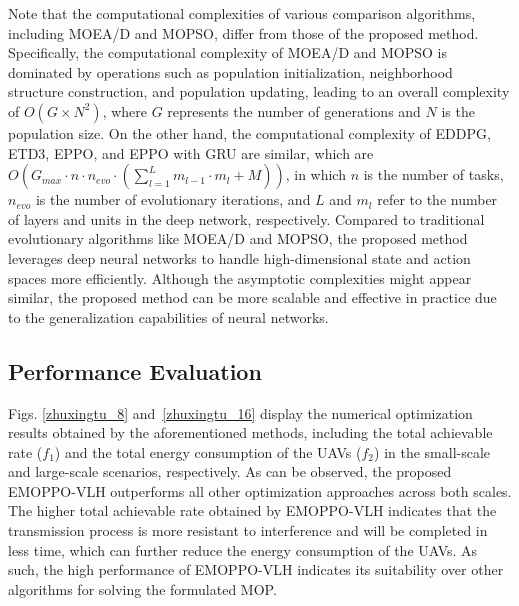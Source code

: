 \documentclass[10pt,journal,compsoc]{IEEEtran}
\begin{document}
\par Note that the computational complexities of various comparison algorithms, including MOEA/D and MOPSO, differ from those of the proposed method. Specifically, the computational complexity of MOEA/D and MOPSO is dominated by operations such as population initialization, neighborhood structure construction, and population updating, leading to an overall complexity of $O(G \times N^2)$, where $G$ represents the number of generations and $N$ is the population size. On the other hand, the computational complexity of EDDPG, ETD3, EPPO, and EPPO with GRU are similar, which are $O(G_{max} \cdot n \cdot n_{evo} \cdot (\sum_{l=1}^L m_{l-1} \cdot m_l + M))$, in which $n$ is the number of tasks, $n_{evo}$ is the number of evolutionary iterations, and $L$ and $m_l$ refer to the number of layers and units in the deep network, respectively. Compared to traditional evolutionary algorithms like MOEA/D and MOPSO, the proposed method leverages deep neural networks to handle high-dimensional state and action spaces more efficiently. Although the asymptotic complexities might appear similar, the proposed method can be more scalable and effective in practice due to the generalization capabilities of neural networks.

\subsection{Performance Evaluation}

\par Figs. \ref{zhuxingtu_8} and~\ref{zhuxingtu_16} display the numerical optimization results obtained by the aforementioned methods, including the total achievable rate ($f_1$) and the total energy consumption of the UAVs ($f_2$) in the small-scale and large-scale scenarios, respectively. As can be observed, the proposed EMOPPO-VLH outperforms all other optimization approaches across both scales. The higher total achievable rate obtained by EMOPPO-VLH indicates that the transmission process is more resistant to interference and will be completed in less time, which can further reduce the energy consumption of the UAVs. As such, the high performance of EMOPPO-VLH indicates its suitability over other algorithms for solving the formulated MOP.

\end{document}
